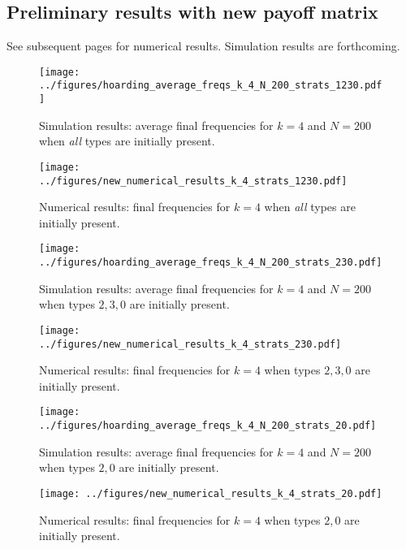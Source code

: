 \documentclass[13pt]{amsart}
\begin{document}
\subsection*{Preliminary results with new payoff matrix}

See subsequent pages for numerical results.
Simulation results are forthcoming.

\clearpage

\begin{figure}
    \texttt{[image: ../figures/hoarding\_average\_freqs\_k\_4\_N\_200\_strats\_1230.pdf]}
    \caption{Simulation results: average final frequencies for $k = 4$ and $N = 200$ when \emph{all} types are initially present.}
\end{figure}

\begin{figure}
    \texttt{[image: ../figures/new\_numerical\_results\_k\_4\_strats\_1230.pdf]}
    \caption{Numerical results: final frequencies for $k = 4$ when \emph{all} types are initially present.}
\end{figure}

\begin{figure}
    \texttt{[image: ../figures/hoarding\_average\_freqs\_k\_4\_N\_200\_strats\_230.pdf]}
    \caption{Simulation results: average final frequencies for $k = 4$ and $N = 200$ when types $2, 3, 0$ are initially present.}
\end{figure}

\begin{figure}
    \texttt{[image: ../figures/new\_numerical\_results\_k\_4\_strats\_230.pdf]}
    \caption{Numerical results: final frequencies for $k = 4$ when types $2, 3, 0$ are initially present.}
\end{figure}


\begin{figure}
    \texttt{[image: ../figures/hoarding\_average\_freqs\_k\_4\_N\_200\_strats\_20.pdf]}
    \caption{Simulation results: average final frequencies for $k = 4$ and $N = 200$ when types $2, 0$ are initially present.}
\end{figure}

\begin{figure}
    \texttt{[image: ../figures/new\_numerical\_results\_k\_4\_strats\_20.pdf]}
    \caption{Numerical results: final frequencies for $k = 4$ when types $2, 0$ are initially present.}
\end{figure}
\end{document}
